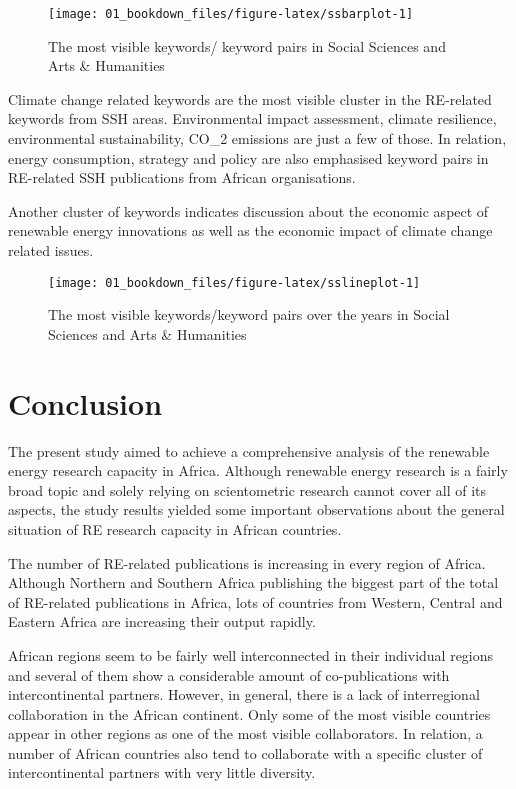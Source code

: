 \documentclass[12pt,twoside]{report}
\begin{document}
\begin{figure}
\texttt{[image: 01\_bookdown\_files/figure-latex/ssbarplot-1]} \caption{The most visible keywords/ keyword pairs in Social Sciences and Arts & Humanities}\label{fig:ssbarplot}
\end{figure}

Climate change related keywords are the most visible cluster in the RE-related keywords from SSH areas. Environmental impact assessment, climate resilience, environmental sustainability, CO\_2 emissions are just a few of those. In relation, energy consumption, strategy and policy are also emphasised keyword pairs in RE-related SSH publications from African organisations.

Another cluster of keywords indicates discussion about the economic aspect of renewable energy innovations as well as the economic impact of climate change related issues.

\begin{figure}
\texttt{[image: 01\_bookdown\_files/figure-latex/sslineplot-1]} \caption{The most visible keywords/keyword pairs over the years in Social Sciences and Arts & Humanities}\label{fig:sslineplot}
\end{figure}

\hypertarget{conclusion}{%
\chapter{Conclusion}\label{conclusion}}

The present study aimed to achieve a comprehensive analysis of the renewable energy research capacity in Africa. Although renewable energy research is a fairly broad topic and solely relying on scientometric research cannot cover all of its aspects, the study results yielded some important observations about the general situation of RE research capacity in African countries.

The number of RE-related publications is increasing in every region of Africa. Although Northern and Southern Africa publishing the biggest part of the total of RE-related publications in Africa, lots of countries from Western, Central and Eastern Africa are increasing their output rapidly.

African regions seem to be fairly well interconnected in their individual regions and several of them show a considerable amount of co-publications with intercontinental partners. However, in general, there is a lack of interregional collaboration in the African continent. Only some of the most visible countries appear in other regions as one of the most visible collaborators. In relation, a number of African countries also tend to collaborate with a specific cluster of intercontinental partners with very little diversity.
\end{document}
